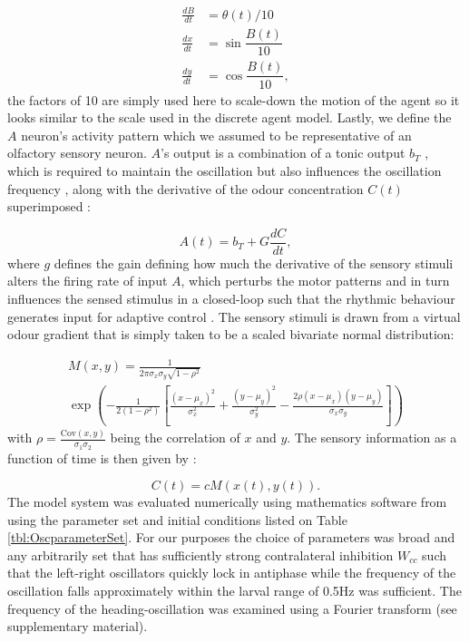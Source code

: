 \documentclass[11pt,a4paper]{article}
\newcommand{\Cov}{\mathrm{Cov}}
\newcommand{\todoKL}[1]{\todo[author=KL,color=blue!40, size=\tiny,inline]{#1}}
\begin{document}
\begin{align}
\frac{dB}{dt} &= \theta(t)/10 \\
\frac{dx}{dt} &= \sin{\dfrac{B(t)}{10}} \\
\frac{dy}{dt} &= \cos{\dfrac{B(t)}{10}},
\end{align}
 the factors of 10 are simply used here to scale-down the motion of the agent so it looks similar to the scale used in the discrete agent model.
Lastly, we define the $A$ neuron's activity pattern which we assumed to be representative of an olfactory sensory neuron. $A$'s output is a combination of a tonic output $b_T$ , which is required to maintain the oscillation but also influences the oscillation frequency \cite{lansner1997realistic}, along with the derivative of the odour concentration $C(t)$ superimposed : 

\begin{equation}
A(t) = b_T + G \frac{dC}{dt},
\end{equation}
where $g$ defines the gain defining how much the derivative of the sensory stimuli alters the firing  rate of input $A$, which perturbs the motor patterns and in turn influences the sensed stimulus in a closed-loop such that the rhythmic behaviour generates input for adaptive control \cite[see][]{willis1997centrally}.
The sensory stimuli is drawn from a virtual odour gradient that is simply taken to be a scaled bivariate normal distribution:

\begin{multline}
M(x,y) = \frac{1}{2 \pi  \sigma_x \sigma_y \sqrt{1-\rho^2}}\\
      \exp\left(
        -\frac{1}{2(1-\rho^2)}
        \left[
          \frac{(x-\mu_x)^2}{\sigma_x^2} + 
          \frac{(y-\mu_y)^2}{\sigma_y^2} -
          \frac{2\rho(x-\mu_x)(y-\mu_y)}{\sigma_x \sigma_y} \right]\right)
\label{eqn:bivariateNormal}
\end{multline}
with $\rho = \frac{\Cov(x,y)}{\sigma_1 \sigma_2}$ being the correlation of $x$ and $y$.
The sensory information as a function of time is then given by :

\begin{equation}
C(t) = c M(x(t),y(t)).
\label{eq:SensoryFunction}
\end{equation}
The model system was evaluated numerically using mathematics software from \cite{math}
using the parameter set and initial conditions listed on Table \ref{tbl:OscparameterSet}.
 For our purposes the choice of parameters was broad and any arbitrarily set that has sufficiently strong contralateral inhibition $W_{cc}$ such that the left-right oscillators quickly lock in antiphase while the frequency of the oscillation falls approximately within the larval range of 0.5Hz was sufficient. The frequency of the heading-oscillation was examined using a Fourier transform (see supplementary material).
\end{document}
